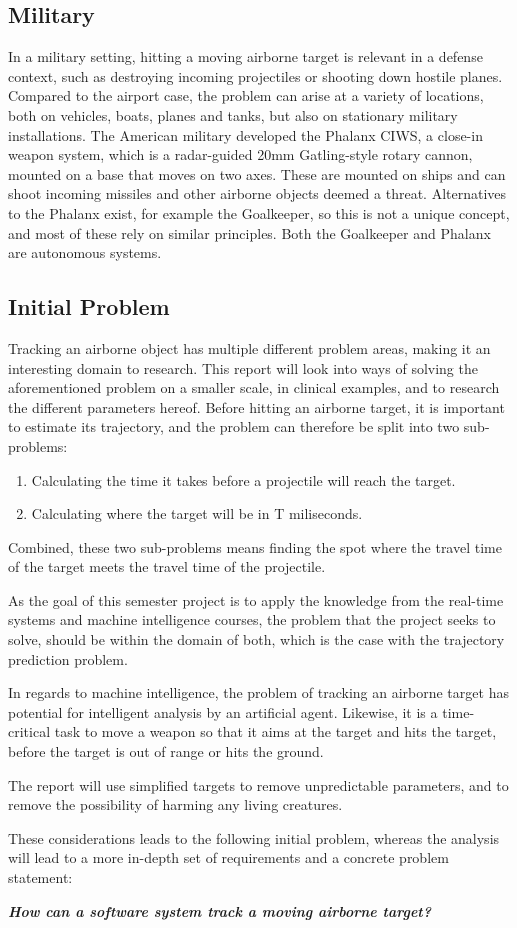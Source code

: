 \subsection{Military}
In a military setting, hitting a moving airborne target is relevant in a defense context, such as destroying incoming projectiles or shooting down hostile planes.
Compared to the airport case, the problem can arise at a variety of locations, both on vehicles, boats, planes and tanks, but also on stationary military installations.
The American military developed the Phalanx CIWS, a close-in weapon system, which is a radar-guided 20mm Gatling-style rotary cannon, mounted on a base that moves on two axes.
These are mounted on ships and can shoot incoming missiles and other airborne objects deemed a threat.
Alternatives to the Phalanx exist, for example the Goalkeeper, so this is not a unique concept, and most of these rely on similar principles.
Both the Goalkeeper and Phalanx are autonomous systems.

\subsection{Initial Problem}
Tracking an airborne object has multiple different problem areas, making it an interesting domain to research.
This report will look into ways of solving the aforementioned problem on a smaller scale, in clinical examples, and to research the different parameters hereof.
Before hitting an airborne target, it is important to estimate its trajectory, and the problem can therefore be split into two sub-problems:
\begin{enumerate}
  \item Calculating the time it takes before a projectile will reach the target.
  \item Calculating where the target will be in T miliseconds.
\end{enumerate}
Combined, these two sub-problems means finding the spot where the travel time of the target meets the travel time of the projectile.

As the goal of this semester project is to apply the knowledge from the real-time systems and machine intelligence courses, the problem that the project seeks to solve, should be within the domain of both, which is the case with the trajectory prediction problem.

In regards to machine intelligence, the problem of tracking an airborne target has potential for intelligent analysis by an artificial agent.
Likewise, it is a time-critical task to move a weapon so that it aims at the target and hits the target, before the target is out of range or hits the ground.

The report will use simplified targets to remove unpredictable parameters, and to remove the possibility of harming any living creatures.

These considerations leads to the following initial problem, whereas the analysis will lead to a more in-depth set of requirements and a concrete problem statement:
\label{key:initialProblem}

\begin{center}
  \textit{\textbf{How can a software system track a moving airborne target?}}
\end{center}

